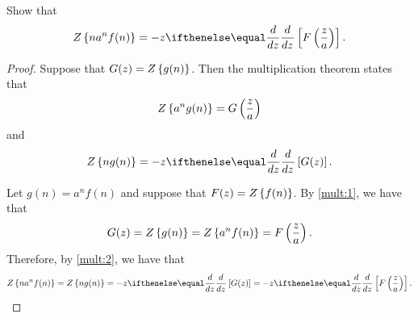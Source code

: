 \begin{problem}{12.3}
  Show that
  \begin{align*}
    \Z{n a^n f(n)} = -z \der{z}{}\left[F\left(\frac{z}{a}\right)\right].
  \end{align*}
\end{problem}

\begin{proof}
  Suppose that $G(z) = Z\left\{ {g(n)} \right\}$. Then the multiplication theorem states that
  \begin{align}
    \label{mult:1}
    Z\left\{ {a^n g(n)} \right\} = G\left(\frac{z}{a}\right)
  \end{align}
  and
  \begin{align}
    \label{mult:2}
    \Z{n g(n)} = -z \der{z}{}\left[G(z)\right].
  \end{align}

  Let $g(n) = a^n f(n)$ and suppose that $F(z) = Z\left\{ {f(n)} \right\}$. By \eqref{mult:1}, we have that
  \begin{align*}
    G(z) = Z\left\{ {g(n)} \right\} = Z\left\{ {a^n f(n)} \right\} = F\left(\frac{z}{a}\right).
  \end{align*}
  Therefore, by \eqref{mult:2}, we have that
  \begin{align*}
    \Z{n a^n f(n)} = \Z{n g(n)} = -z \der{z}{}\left[G(z)\right] = -z \der{z}{}\left[F\left(\frac{z}{a}\right)\right].
  \end{align*}
\end{proof}
\newpage
